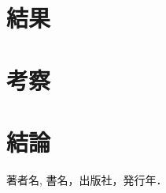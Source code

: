 \documentclass[11pt,dvipdfmx]{jarticle}
\begin{document}
\section{結果}
			
\section{考察}
\section{結論}

\begin{thebibliography}{9}%
	 著者名, 書名，出版社，発行年．
\end{thebibliography}
\end{document}
